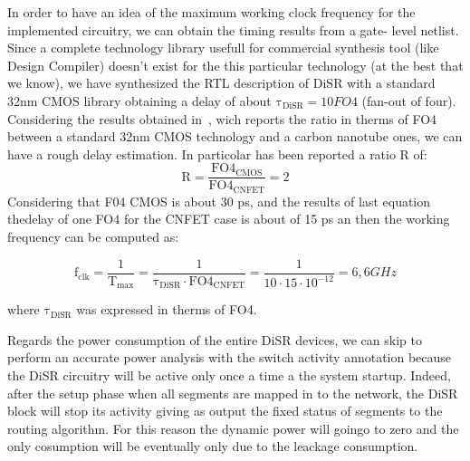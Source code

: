 In order to have an idea of the maximum working clock frequency for the
implemented circuitry, we can obtain the timing results from a gate-
level netlist. Since a complete technology library usefull for 
commercial synthesis tool (like Design Compiler) doesn't exist for the this particular technology
(at the best that we know), we have synthesized the RTL description of DiSR
with a standard 32nm CMOS library obtaining 
a delay of about $\mathrm{\tau_{DiSR}=10} FO4$ (fan-out of four).
Considering the results obtained in~\cite{deng_isscc07}, wich reports the
ratio in therms of FO4 between a standard 32nm CMOS technology and a
carbon nanotube ones, we can have a rough delay estimation.
In particolar has been reported a ratio R of: 
\begin{equation}
\mathrm{R=\frac{FO4_{CMOS}}{FO4_{CNFET}}=2} 
\end{equation}
Considering that F04 CMOS is about 30 ps, and the results of  
last equation thedelay of one FO4 for the CNFET case is about of
15 ps an then the working frequency can be computed as:

\begin{equation}
\mathrm{f_{clk}=\frac{1}{T_{max}}=\frac{1}{\tau_{DiSR} \cdot FO4_{CNFET}}}=
\frac{1}{10\cdot 15 \cdot 10^{-12}}=6,6 GHz
\end{equation}

where $\mathrm{\tau_{DiSR}}$ was expressed in therms of FO4.

Regards the power
consumption of the entire DiSR devices, we can skip to perform an accurate
power analysis with the switch activity annotation because the DiSR circuitry
will be active only once a time a the system startup. Indeed, after the setup
phase when all segments are mapped in to the network, the DiSR block will stop
its activity giving as output the fixed status of segments to the routing
algorithm. For this reason the dynamic power will goingo to zero and the only
cosumption will be eventually only due to the leackage consumption. 	
